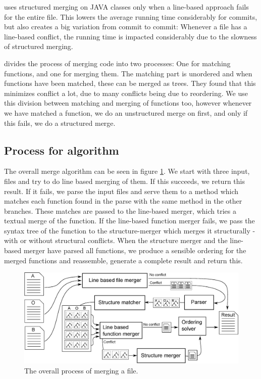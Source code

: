 \documentclass[11pt]{article}
\begin{document}
\citet{Olav} uses structured merging on JAVA classes only when a line-based approach fails for the entire file. This lowers the average running time considerably for commits, but also creates a big variation from commit to commit: Whenever a file has a line-based conflict, the running time is impacted considerably due to the slowness of structured merging.

\citet{Apel} divides the process of merging code into two processes: One for matching functions, and one for merging them. The matching part is unordered and when functions have been matched, these can be merged as trees. They found that this minimizes conflict a lot, due to many conflicts being due to reordering. We use this division between matching and merging of functions too, however whenever we have matched a function, we do an unstructured merge on first, and only if this fails, we do a structured merge.

\subsection{Process for algorithm}
The overall merge algorithm can be seen in figure \ref{OverallMergingProcess}. We start with three input, files and try to do line based merging of them. If this succeeds, we return this result. If it fails, we parse the input files and serve them to a method which matches each function found in the parse with the same method in the other branches. These matches are passed to the line-based merger, which tries a textual merge of the function. If the line-based function merger fails, we pass the syntax tree of the function to the structure-merger which merges it structurally - with or without structural conflicts. When the structure merger and the line-based merger have parsed all functions, we produce a sensible ordering for the merged functions and reassemble, generate a complete result and return this.

\begin{figure}
   \centerline{\includegraphics[scale=0.55]{drawings/eps/overallmergingprocess.eps}}
   \caption{The overall process of merging a file.}
   \label{OverallMergingProcess}
\end{figure}
\end{document}
